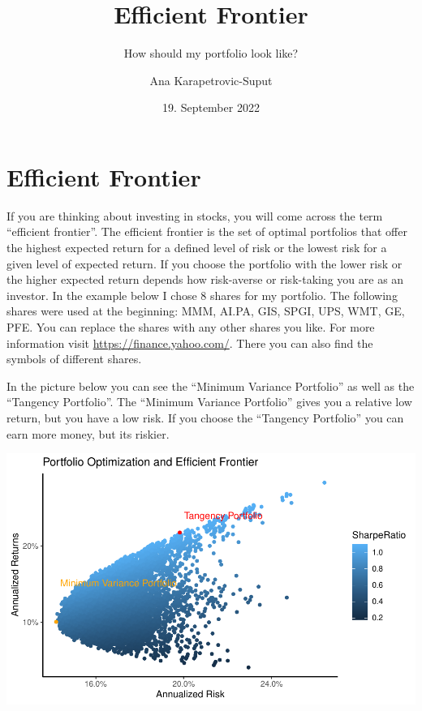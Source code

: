 \documentclass[
]{article}
\title{Efficient Frontier}
\subtitle{How should my portfolio look like?}
\author{Ana Karapetrovic-Suput}
\date{19. September 2022}
\begin{document}
\maketitle

\newpage 
\tableofcontents 
\listoftables
\newpage

\hypertarget{efficient-frontier}{%
\section{Efficient Frontier}\label{efficient-frontier}}

If you are thinking about investing in stocks, you will come across the
term ``efficient frontier''. The efficient frontier is the set of
optimal portfolios that offer the highest expected return for a defined
level of risk or the lowest risk for a given level of expected return.
If you choose the portfolio with the lower risk or the higher expected
return depends how risk-averse or risk-taking you are as an investor. In
the example below I chose 8 shares for my portfolio. The following
shares were used at the beginning: MMM, AI.PA, GIS, SPGI, UPS, WMT, GE,
PFE. You can replace the shares with any other shares you like. For more
information visit \url{https://finance.yahoo.com/}. There you can also
find the symbols of different shares.

In the picture below you can see the ``Minimum Variance Portfolio'' as
well as the ``Tangency Portfolio''. The ``Minimum Variance Portfolio''
gives you a relative low return, but you have a low risk. If you choose
the ``Tangency Portfolio'' you can earn more money, but its riskier.

\begin{center}\includegraphics{EfficientFrontier_files/figure-latex/plot efficient frontier-1} \end{center}
\end{document}

